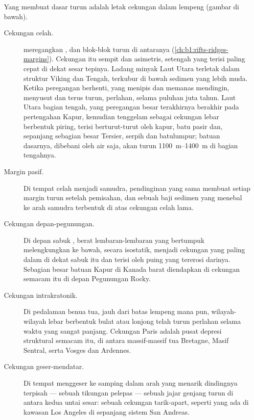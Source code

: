 Yang membuat dasar turun adalah letak cekungan dalam lempeng (gambar di bawah).

\begin{description}
  \item[Cekungan celah.]  meregangkan , dan blok-blok turun di antaranya (\cref{ch:b1:rifts-ridges-margins}). Cekungan itu sempit dan asimetris, setengah  yang terisi paling cepat di dekat sesar tepinya. Ladang minyak Laut Utara terletak dalam struktur  Viking dan  Tengah, terkubur di bawah sedimen yang lebih muda. Ketika peregangan berhenti,  yang menipis dan memanas mendingin, menyusut dan terus turun, perlahan, selama puluhan juta tahun. Laut Utara bagian tengah, yang peregangan besar terakhirnya berakhir pada pertengahan Kapur, kemudian tenggelam sebagai cekungan lebar berbentuk piring, terisi berturut-turut oleh kapur, batu pasir dan, sepanjang sebagian besar Tersier, serpih dan batulumpur; batuan dasarnya, dibebani oleh air saja, akan turun \qtyrange{1100}{1400}{m} di bagian tengahnya.
  \item[Margin pasif.] Di tempat celah menjadi samudra, pendinginan yang sama membuat setiap margin turun setelah pemisahan, dan sebuah baji sedimen yang menebal ke arah samudra terbentuk di atas cekungan celah lama.
  \item[Cekungan depan-pegunungan.] Di depan sabuk , berat lembaran-lembaran  yang bertumpuk melengkungkan  ke bawah, secara isostatik, menjadi cekungan yang paling dalam di dekat sabuk itu dan terisi oleh puing yang tererosi darinya. Sebagian besar batuan Kapur di Kanada barat diendapkan di cekungan semacam itu di depan Pegunungan Rocky.
  \item[Cekungan intrakratonik.] Di pedalaman benua tua, jauh dari batas lempeng mana pun, wilayah-wilayah lebar berbentuk bulat atau lonjong telah turun perlahan selama waktu yang sangat panjang. Cekungan Paris adalah pusat depresi struktural semacam itu, di antara massif-massif tua Bretagne, Masif Sentral, serta Vosges dan Ardennes.
  \item[Cekungan geser-mendatar.] Di tempat  menggeser ke samping dalam arah yang menarik dindingnya terpisah --- sebuah tikungan pelepas --- sebuah jajar genjang  turun di antara kedua untai sesar: sebuah cekungan tarik-apart, seperti yang ada di kawasan Los Angeles di sepanjang sistem San Andreas.
\end{description}

